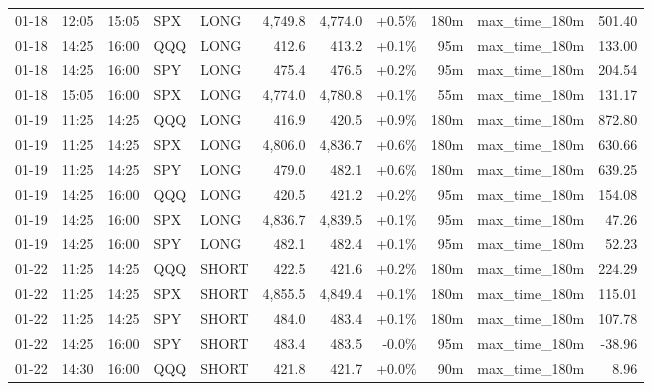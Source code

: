 \documentclass[11pt,a4paper,twoside]{article}
\begin{document}
\begin{center}
\begin{longtable}{>{\color{txtmain}}l l l l l r r r r >{\color{txtmain}}l r}
01-18 & 12:05 & 15:05 & SPX & LONG & 4,749.8 & 4,774.0 & \textcolor{wingreen}{+0.5\%} & 180m & max\_time\_180m & \textcolor{wingreen}{501.40} \\
01-18 & 14:25 & 16:00 & QQQ & LONG & 412.6 & 413.2 & \textcolor{wingreen}{+0.1\%} & 95m & max\_time\_180m & \textcolor{wingreen}{133.00} \\
01-18 & 14:25 & 16:00 & SPY & LONG & 475.4 & 476.5 & \textcolor{wingreen}{+0.2\%} & 95m & max\_time\_180m & \textcolor{wingreen}{204.54} \\
01-18 & 15:05 & 16:00 & SPX & LONG & 4,774.0 & 4,780.8 & \textcolor{wingreen}{+0.1\%} & 55m & max\_time\_180m & \textcolor{wingreen}{131.17} \\
01-19 & 11:25 & 14:25 & QQQ & LONG & 416.9 & 420.5 & \textcolor{wingreen}{+0.9\%} & 180m & max\_time\_180m & \textcolor{wingreen}{872.80} \\
01-19 & 11:25 & 14:25 & SPX & LONG & 4,806.0 & 4,836.7 & \textcolor{wingreen}{+0.6\%} & 180m & max\_time\_180m & \textcolor{wingreen}{630.66} \\
01-19 & 11:25 & 14:25 & SPY & LONG & 479.0 & 482.1 & \textcolor{wingreen}{+0.6\%} & 180m & max\_time\_180m & \textcolor{wingreen}{639.25} \\
01-19 & 14:25 & 16:00 & QQQ & LONG & 420.5 & 421.2 & \textcolor{wingreen}{+0.2\%} & 95m & max\_time\_180m & \textcolor{wingreen}{154.08} \\
01-19 & 14:25 & 16:00 & SPX & LONG & 4,836.7 & 4,839.5 & \textcolor{wingreen}{+0.1\%} & 95m & max\_time\_180m & \textcolor{wingreen}{47.26} \\
01-19 & 14:25 & 16:00 & SPY & LONG & 482.1 & 482.4 & \textcolor{wingreen}{+0.1\%} & 95m & max\_time\_180m & \textcolor{wingreen}{52.23} \\
01-22 & 11:25 & 14:25 & QQQ & SHORT & 422.5 & 421.6 & \textcolor{wingreen}{+0.2\%} & 180m & max\_time\_180m & \textcolor{wingreen}{224.29} \\
01-22 & 11:25 & 14:25 & SPX & SHORT & 4,855.5 & 4,849.4 & \textcolor{wingreen}{+0.1\%} & 180m & max\_time\_180m & \textcolor{wingreen}{115.01} \\
01-22 & 11:25 & 14:25 & SPY & SHORT & 484.0 & 483.4 & \textcolor{wingreen}{+0.1\%} & 180m & max\_time\_180m & \textcolor{wingreen}{107.78} \\
01-22 & 14:25 & 16:00 & SPY & SHORT & 483.4 & 483.5 & \textcolor{lossred}{-0.0\%} & 95m & max\_time\_180m & \textcolor{lossred}{-38.96} \\
01-22 & 14:30 & 16:00 & QQQ & SHORT & 421.8 & 421.7 & \textcolor{wingreen}{+0.0\%} & 90m & max\_time\_180m & \textcolor{wingreen}{8.96} \\

\end{longtable}
\end{center}
\end{document}
